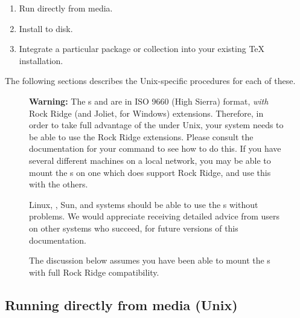 \documentclass{article}
\begin{document}
\begin{enumerate}
\item Run directly from media.
\item Install to disk.
\item Integrate a particular package or collection into your existing
\TeX{} installation.
\end{enumerate}

\noindent The following sections describes the Unix-specific procedures
for each of these.

\ifSingleColumn \begin{figure}[ht]\noindent \fi
\begin{warningbox}
\textbf{Warning: } The \TK{} \CD{}s and \DVD{} are in ISO 9660 (High Sierra)
format, \emph{with} Rock Ridge (and Joliet, for Windows)
extensions. Therefore, in order to take full advantage of the \TK{}
under Unix, your system needs to be able to use the Rock Ridge
extensions.  Please consult the documentation for your 
command to see how to do this.  If you have several different machines
on a local network, you may be able to mount the \CD{}s on one which
does support Rock Ridge, and use this with the others.

\leavevmode\quad Linux, , Sun, and 
systems should be able to use the \CD{}s without problems. We
would appreciate receiving detailed advice from users on other systems
who succeed, for future versions of this documentation.

\leavevmode\quad
The discussion below assumes you have been able to mount
the \CD{}s with full Rock Ridge compatibility.
\end{warningbox}
\ifSingleColumn\end{figure}\fi


% 
\subsection{Running \protect\TL{} directly from media (Unix)}

\def\runlive{%
It is possible to use the \TeX{} system directly from the \pkgname{live}
\DVD{}, without installing the distribution to disk.  (Thus the name
\TeX\ `Live', in fact.)  It is \emph{not} possible to run \TeX{}
directly from the other \CD s (see section~\ref{sec:multiple-dist},
\p.\pageref{sec:multiple-dist}).
}
\end{document}
